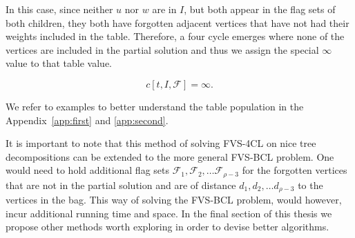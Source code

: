 In this case, since neither \( u \) nor \( w \) are in \( I \), but both appear in the flag sets 
of both children, they both have forgotten adjacent vertices that have not had their weights included 
in the table. Therefore, a four cycle emerges where none of the vertices are included in the partial 
solution and thus we assign the special $\infty$ value to that table value.

\[
c[t, I, \mathcal{F}] = \infty.
\]

We refer to examples to better understand the table population in the Appendix~\ref{app:first} and \ref{app:second}.

It is important to note that this method of solving FVS-4CL on nice tree decompositions can 
be extended to the more general FVS-BCL problem. One would need to hold additional flag sets 
$\mathcal{F}_1, \mathcal{F}_2, \dots \mathcal{F}_{\rho-3}$ for the forgotten vertices that are 
not in the partial solution and are of distance $d_1, d_2, \dots d_{\rho-3}$ to the vertices in 
the bag. This way of solving the FVS-BCL problem, would however, incur additional running time 
and space. In the final section of this thesis we propose other methods worth exploring in order 
to devise better algorithms.